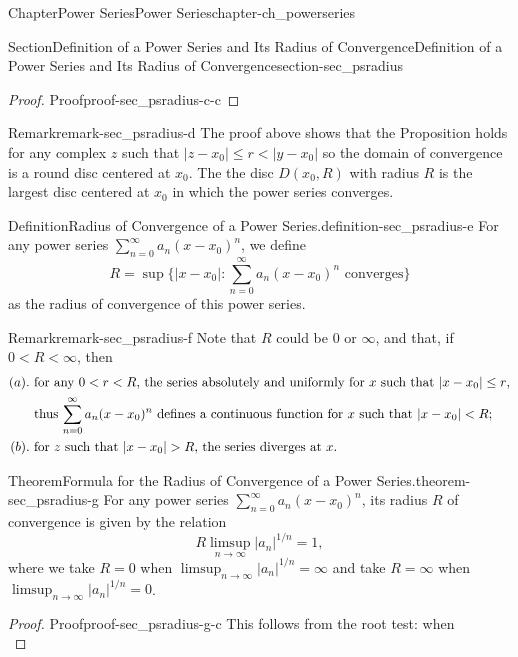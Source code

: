 \documentclass[oneside,10pt,]{book}
\numberwithin{equation}{section}
\newcommand{\lt}{<}
\newcommand{\gt}{>}
\newcommand{\amp}{&}
\begin{document}
\begin{chapterptx}{Chapter}{Power Series}{}{Power Series}{}{}{chapter-ch_powerseries}
\begin{sectionptx}{Section}{Definition of a Power Series and Its Radius of Convergence}{}{Definition of a Power Series and Its Radius of Convergence}{}{}{section-sec_psradius}
\begin{proof}{Proof}{}{proof-sec_psradius-c-c}
\end{proof}
\begin{remark}{Remark}{}{remark-sec_psradius-d}%
The proof above shows that the Proposition holds  for any complex \(z\) such that \(|z-x_{0}|\le r \lt  |y-x_{0}|\) so the domain of  convergence is  a round disc centered at \(x_{0}\). The the disc \(D(x_{0}, R)\) with radius \(R\) is the largest disc centered at \(x_{0}\) in which the power series converges.\end{remark}
\begin{definition}{Definition}{Radius of Convergence of  a Power Series.}{definition-sec_psradius-e}%
 For any power series \(\sum_{n=0}^{\infty} a_{n}(x-x_{0})^{n}\), we define%
\begin{equation*}
R =\sup\{ |x-x_{0}|:  \sum_{n=0}^{\infty} a_{n}(x-x_{0})^{n}
\text{ converges}\}
\end{equation*}
as the radius of convergence of  this power series.\end{definition}
\begin{remark}{Remark}{}{remark-sec_psradius-f}%
Note that \(R\) could be \(0\) or \(\infty\), and that, if \(0 \lt R \lt \infty\), then%
\begin{align*}
(a). \amp\text{ for any $0 \lt r \lt R$, the series absolutely and uniformly for $x$ such that $|x-x_{0}|\le r$,} \\
\amp \text{ thus
$ \sum_{n=0}^{\infty} a_{n}(x-x_{0})^{n}$ defines a continuous function for $x$ such that $|x-x_{0}| \lt R$;}\\
(b). \amp\text{ for $z$ such that $|x-x_{0}|\gt R$, the series diverges at $x$.}
\end{align*}
%
\end{remark}
\begin{theorem}{Theorem}{Formula for the Radius of Convergence of a Power Series.}{}{theorem-sec_psradius-g}%
For any power series \(\sum_{n=0}^{\infty} a_{n}(x-x_{0})^{n}\), its radius \(R\) of convergence is given by the relation%
\begin{equation*}
R \limsup_{n\to\infty} \vert a_{n}\vert^{1/n}=1,
\end{equation*}
where we take \(R=0\) when \(\limsup_{n\to\infty} \vert a_{n}\vert^{1/n}=\infty\) and take \(R=\infty\) when \(\limsup_{n\to\infty} \vert a_{n}\vert^{1/n}=0\).\end{theorem}
\begin{proof}{Proof}{}{proof-sec_psradius-g-c}
This follows from the root test: when%
\begin{equation*}

\end{equation*}
\end{proof}
\end{sectionptx}
\end{chapterptx}
\end{document}
